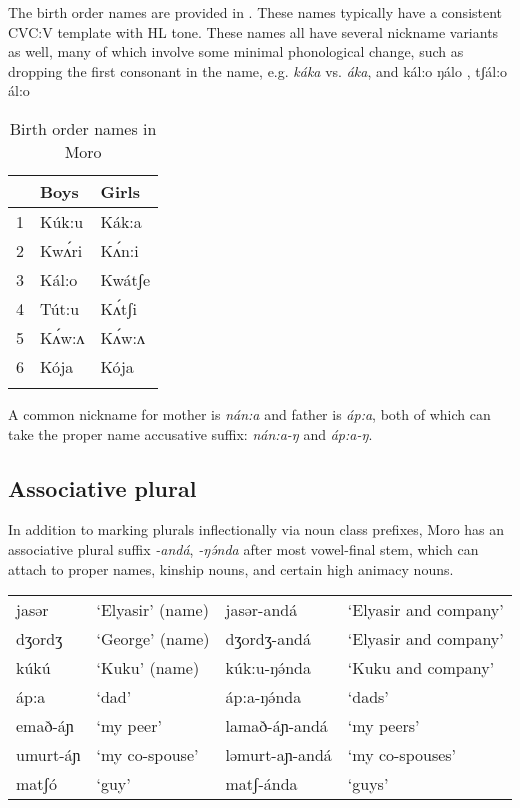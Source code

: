 The birth order names are provided in . These names typically have a consistent CVC:V template with HL tone. These names all have several nickname variants as well, many of which involve some minimal phonological change, such as dropping the first consonant in the name, e.g. \textit{káka} vs. \textit{áka}, and kál:o ŋálo , tʃál:o ál:o
\begin{table}
\caption{Birth order names in Moro}\label{tab:ch6:birthnames}
\begin{tabular}[t]{lll}
\lsptoprule
		& Boys	& Girls \\
\midrule
1 & Kúk:u & Kák:a \\
2 & Kwʌ́ri & Kʌ́n:i \\
3 & Kál:o & Kwátʃe \\ 
4 & Tút:u & Kʌ́tʃi \\
5 & Kʌ́w:ʌ  & Kʌ́w:ʌ \\
6 & Kója  & Kója \\
\lspbottomrule
\end{tabular}	
\end{table}

A common nickname for mother is \textit{nán:a} and father is \textit{áp:a}, both of which can take the proper name accusative suffix: \textit{nán:a-ŋ} and \textit{áp:a-ŋ}.

\subsection{Associative plural}\label{associative}

In addition to marking plurals inflectionally via noun class prefixes, Moro has an associative plural suffix \textit{-andá}, \textit{-ŋə́nda} after most vowel-final stem, which can attach to proper names, kinship nouns, and certain high animacy nouns. 

\ea	
\begin{tabular}[t]{llll}
jasər &  `Elyasir' (name) & jasər-andá & `Elyasir and company'\\
dʒordʒ &  `George' (name) & dʒordʒ-andá & `Elyasir and company'\\
kúkú	& 	`Kuku' (name) & kúk:u-ŋə́nda & `Kuku and company' \\ 
áp:a	& `dad'	& 	áp:a-ŋə́nda & `dads' \\
emað-áɲ & `my peer' & lamað-áɲ-andá & `my peers' \\
umurt-áɲ & `my co-spouse' & ləmurt-aɲ-andá & `my co-spouses' \\
matʃó & `guy'  & 	 matʃ-ánda & `guys'\\	
\end{tabular}
\z

